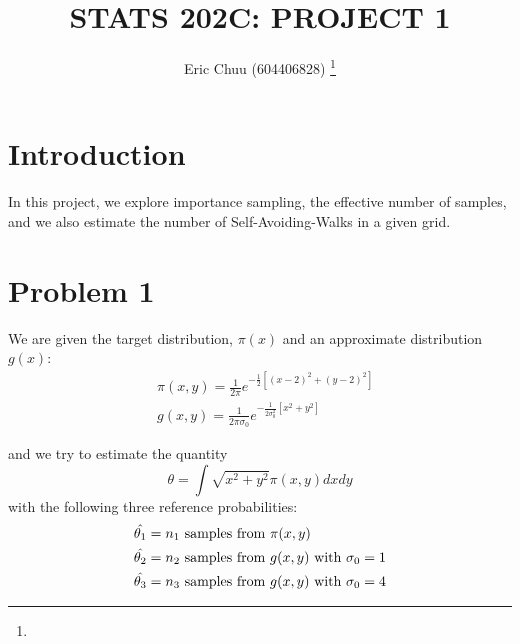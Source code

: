 \documentclass[journal, a4paper]{IEEEtran}
\begin{document}
	\title{STATS 202C: PROJECT 1}
	\author{Eric Chuu (604406828)
	\thanks{}}
	\markboth{}{}
	\maketitle

	

\section*{Introduction}
	In this project, we explore importance sampling, the effective number of samples, and we also estimate the number of Self-Avoiding-Walks in a given grid.

\section*{Problem 1}
	

	We are given the target distribution, $\pi(x)$ and an approximate distribution $g(x)$:
	\begin{align*}
		& \pi(x, y) = \frac{1}{2\pi} e^{-\frac{1}{2} \left[ (x-2)^2 + (y-2)^2 \right]} \\
		& g(x,y) = \frac{1}{2\pi \sigma_0} e^{-\frac{1}{2\sigma_0^2} \left[ x^2 + y^2 \right]}
	\end{align*}
		
	and we try to estimate the quantity $$\theta = \int \sqrt{x^2 + y^2} \pi(x,y) dx dy$$ with the following three reference probabilities:
	\begin{align*}
		\hat{\theta_1} &= n_1 \textnormal{ samples from } \pi(x, y) \\
		\hat{\theta_2} &= n_2 \textnormal{ samples from } g(x,y) \textnormal{ with } \sigma_0 = 1\\
		\hat{\theta_3} &= n_3 \textnormal{ samples from } g(x,y) \textnormal{ with } \sigma_0 = 4
	\end{align*}		
\end{document}
